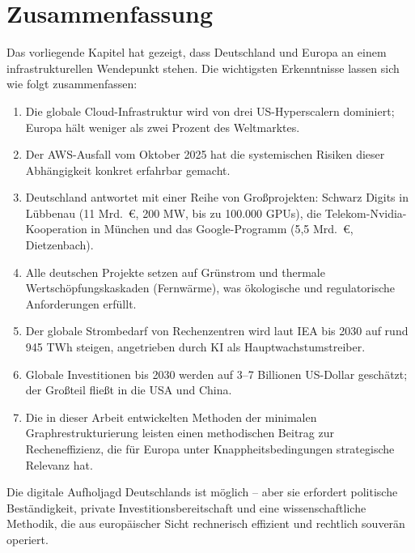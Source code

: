 \documentclass[12pt, a4paper, openany]{report}
\begin{document}
\section{Zusammenfassung}
\label{sec:ki_infrastruktur_zusammenfassung}

Das vorliegende Kapitel hat gezeigt, dass Deutschland und Europa an einem
infrastrukturellen Wendepunkt stehen. Die wichtigsten Erkenntnisse lassen
sich wie folgt zusammenfassen:

\begin{enumerate}[label=(\roman*)]
	\item Die globale Cloud-Infrastruktur wird von drei US-Hyperscalern
	dominiert; Europa hält weniger als zwei Prozent des Weltmarktes.
	\item Der AWS-Ausfall vom Oktober 2025 hat die systemischen Risiken
	dieser Abhängigkeit konkret erfahrbar gemacht.
	\item Deutschland antwortet mit einer Reihe von Großprojekten: Schwarz
	Digits in Lübbenau (11 Mrd.\ €, 200 MW, bis zu 100.000 GPUs), die
	Telekom-Nvidia-Kooperation in München und das Google-Programm
	(5,5 Mrd.\ €, Dietzenbach).
	\item Alle deutschen Projekte setzen auf Grünstrom und thermale
	Wertschöpfungskaskaden (Fernwärme), was ökologische und
	regulatorische Anforderungen erfüllt.
	\item Der globale Strombedarf von Rechenzentren wird laut IEA bis 2030
	auf rund 945 TWh steigen, angetrieben durch KI als Hauptwachstumstreiber.
	\item Globale Investitionen bis 2030 werden auf 3--7 Billionen
	US-Dollar geschätzt; der Großteil fließt in die USA und China.
	\item Die in dieser Arbeit entwickelten Methoden der minimalen
	Graphrestrukturierung leisten einen methodischen Beitrag zur
	Recheneffizienz, die für Europa unter Knappheitsbedingungen
	strategische Relevanz hat.
\end{enumerate}

\noindent
Die digitale Aufholjagd Deutschlands ist möglich -- aber sie erfordert
politische Beständigkeit, private Investitionsbereitschaft und eine
wissenschaftliche Methodik, die aus europäischer Sicht rechnerisch
effizient und rechtlich souverän operiert.

\end{document}
